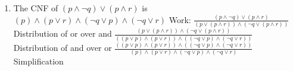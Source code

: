 \documentclass{article}
\begin{document}
\begin{enumerate}
        \item The CNF of $(p \land \lnot q) \lor (p \land r)$ is 
        \newline
        $(p) \land (p \lor r) \land (\lnot q \lor p) \land (\lnot q \lor r)$
        \newline
        \newline
        Work:
        \newline
        $\frac{(p \land \lnot q) \lor (p \land r)} {(p \lor (p \land r)) \land (\lnot q \lor (p \land r))}$ Distribution of or over and
        \newline
        \newline
        $\frac{(p \lor (p \land r)) \land (\lnot q \lor (p \land r))}{((p \lor p) \land (p \lor r)) \land ((\lnot q \lor p) \land (\lnot q \lor r))} $ Distribution of and over or
        \newline
        \newline
        $\frac{((p \lor p) \land (p \lor r)) \land ((\lnot q \lor p) \land (\lnot q \lor r))}{(p) \land (p \lor r) \land (\lnot q \lor p) \land (\lnot q \lor r)} $ Simplification
        \newline
    \end{enumerate}
    \newpage
\end{document}
